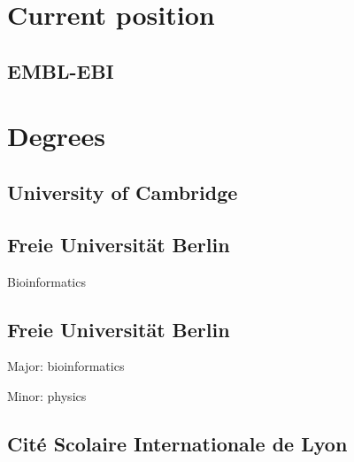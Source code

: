 \documentclass{klmr-cv}
\author{Konrad Rudolph}
\begin{document}
\maketitle

\sidebar

\section{Current position}

\subsection{EMBL-EBI}

\date{2015--2016}
\item{}

\section{Degrees}

\subsection{University of Cambridge}

\date{2016}
\item{}

\subsection{Freie Universität Berlin}

\date{2011}
\item{}
\item{Bioinformatics}

\subsection{Freie Universität Berlin}

\date{2008}
\item{}
\item{Major: bioinformatics}
\item{Minor: physics}

\subsection{\textfrench{Cité Scolaire Internationale de Lyon}}
\end{document}
